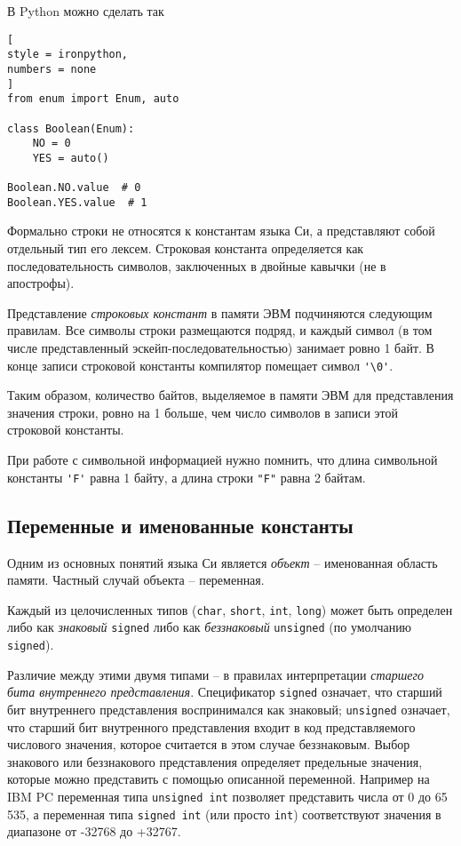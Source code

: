 \documentclass[%
	11pt,
	a4paper,
	utf8,
		]{article}
\begin{document}
В Python можно сделать так
\begin{lstlisting}[
style = ironpython,
numbers = none	
]
from enum import Enum, auto

class Boolean(Enum):
    NO = 0
    YES = auto()
    
Boolean.NO.value  # 0
Boolean.YES.value  # 1
\end{lstlisting}

Формально строки не относятся к константам языка Си, а представляют собой отдельный тип его лексем. Строковая константа определяется как последовательность символов, заключенных в двойные кавычки (не в апострофы).

Представление \emph{строковых констант} в памяти ЭВМ подчиняются следующим правилам. Все символы строки размещаются подряд, и каждый символ (в том числе представленный эскейп-последовательностью) занимает ровно 1 байт. В конце записи строковой константы компилятор помещает символ \verb*|'\0'|.

Таким образом, количество байтов, выделяемое в памяти ЭВМ для представления значения строки, ровно на 1 больше, чем число символов в записи этой строковой константы.

При работе с символьной информацией нужно помнить, что длина символьной константы \verb*|'F'| равна 1 байту, а длина строки \verb|"F"| равна 2 байтам.

\subsection{Переменные и именованные константы}

Одним из основных понятий языка Си является \emph{объект} -- именованная область памяти. Частный случай объекта -- переменная.

Каждый из целочисленных типов (\verb|char|, \verb*|short|, \verb|int|, \verb*|long|) может быть определен либо как \emph{знаковый} \verb|signed| либо как \emph{беззнаковый} \verb*|unsigned| (по умолчанию \verb|signed|). 

Различие между этими двумя типами -- в правилах интерпретации \emph{старшего бита внутреннего представления}. Спецификатор \verb*|signed| означает, что старший бит внутреннего представления воспринимался как знаковый; \verb|unsigned| означает, что старший бит внутренного представления входит в код представляемого числового значения, которое считается в этом случае беззнаковым. Выбор знакового или беззнакового представления определяет предельные значения, которые можно представить с помощью описанной переменной. Например на IBM PC переменная типа \verb|unsigned int| позволяет представить числа от 0 до 65 535, а переменная типа \verb*|signed int| (или просто \verb*|int|) соответствуют значения в диапазоне от -32768 до +32767. 
\end{document}
